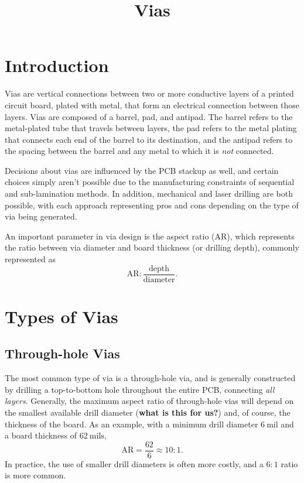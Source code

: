 \documentclass{article}
\title{Vias}
\author{}
\date{}
\begin{document}
\maketitle
\setcounter{section}{0}
\section{Introduction}
Vias are vertical connections between two or more conductive layers of a printed circuit board, plated with metal, that form an electrical connection between those layers. Vias are composed of a barrel, pad, and antipad. The barrel refers to the metal-plated tube that travels between layers, the pad refers to the metal plating that connects each end of the barrel to its destination, and the antipad refers to the spacing between the barrel and any metal to which it is \textit{not} connected.

Decisions about vias are influenced by the PCB stackup as well, and certain choices simply aren't possible due to the manufacturing constraints of sequential and sub-lamination methods. In addition, mechanical and laser drilling are both possible, with each approach representing pros and cons depending on the type of via being generated.

An important parameter in via design is the aspect ratio (AR), which represents the ratio between via diameter and board thickness (or drilling depth), commonly represented as 
\[
	\mathrm{AR:} \frac{\mathrm{depth}}{\mathrm{diameter}}.
\]

\section{Types of Vias}
\subsection{Through-hole Vias}
The most common type of via is a through-hole via, and is generally constructed by drilling a top-to-bottom hole throughout the entire PCB, connecting \textit{all layers}. Generally, the maximum aspect ratio of through-hole vias will depend on the smallest available drill diameter (\textbf{what is this for us?}) and, of course, the thickness of the board. As an example, with a minimum drill diameter \(6 \ \mathrm{mil}\) and a board thickness of \(62 \ \mathrm{mils}\), 
\[
	\mathrm{AR} = \frac{62}{6} \approx 10:1.
\]
In practice, the use of smaller drill diameters is often more costly, and a \(6:1\) ratio is more common.
\end{document}
